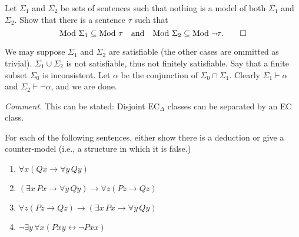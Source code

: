 \begin{exercise}
  Let $\Sigma_1$ and $\Sigma_2$ be sets of sentences such that nothing is a model of both $\Sigma_1$ and $\Sigma_2$. Show that there is a sentence $\tau$ such that
  \[
    \text{Mod } \Sigma_1 \subseteq \text{Mod } \tau \quad \text{and} \quad \text{Mod } \Sigma_2 \subseteq \text{Mod } \lnot \tau.\qedhere
  \]
\end{exercise}

We may suppose $\Sigma_1$ and $\Sigma_2$ are satisfiable (the other cases are ommitted as trivial). $\Sigma_1\cup \Sigma_2$ is not satisfiable, thus not finitely satisfiable. Say that a finite subset $\Sigma_0$ is inconsistent. Let $\alpha$ be the conjunction of $\Sigma_0\cap \Sigma_1$. Clearly $\Sigma_1\vdash \alpha$ and $\Sigma_2\vdash \neg \alpha$, and we are done.

\textit{Comment.} This can be stated: Disjoint $\text{EC}_\Delta$ classes can be separated by an EC class.

\begin{exercise}
  For each of the following sentences, either show there is a deduction or give a counter-model (i.e., a structure in which it is false.)
  \begin{enumerate}[label=(\alph*)]
    \item $\forall x (Qx \rightarrow \forall y \, Qy)$
    \item $(\exists x \, Px \rightarrow \forall y \, Qy) \rightarrow \forall z (Pz \rightarrow Qz)$
    \item $\forall z (Pz \rightarrow Qz) \rightarrow (\exists x \, Px \rightarrow \forall y \, Qy)$
    \item $\neg \exists y \, \forall x (Pxy \leftrightarrow \neg Pxx)$\qedhere
  \end{enumerate}
\end{exercise}

